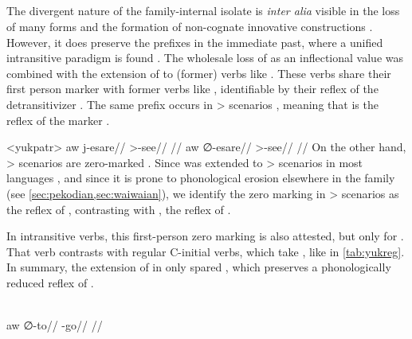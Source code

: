 \subsection{\yukpa {}}
\label{sec:yukpa}
The divergent nature of the family-internal isolate \yukpa is \textit{inter alia} visible in the loss of many \setone forms and the formation of non-cognate innovative constructions \parencite{meira2006syntactic}.
However, it does preserve the \setone prefixes in the immediate past, where a unified intransitive paradigm is found .
The wholesale loss of  as an inflectional value was combined with the extension of   to (former)  verbs like  .
%
%
%
These verbs share their first person marker  with former  verbs like  , identifiable by their reflex of the detransitivizer \detrz.
The same prefix occurs in > scenarios , meaning that  is the reflex of the \PC {} marker .

\pex<yukpatr>\yukpa \parencite[][139]{meira2006syntactic}
\begingl
\gla aw j-esare//
\glb {} >-see//
\glft {}//
\endgl
{}
\begingl
\gla aw {\normalfont ∅}-esare//
\glb {} >-see//
\glft {}//
\endgl
\xe
On the other hand, > scenarios are zero-marked .
Since \PC {}  was extended to > scenarios in most languages \parencite[81--82]{gildea1998}, and since it is prone to phonological erosion elsewhere in the family (see \cref{sec:pekodian,sec:waiwaian}), we identify the zero marking in > scenarios as the \yukpa reflex of , contrasting with , the reflex of .

In intransitive verbs, this first-person zero marking is also attested, but only for   .
That verb contrasts with regular C-initial verbs, which take , like  in \cref{tab:yukreg}.
In summary, the extension of  in \yukpa only spared  , which preserves a phonologically reduced reflex of .

\yukpa \parencite[][139]{meira2006syntactic}\\
\begingl
\gla aw {\normalfont ∅}-to//
\glb {} -go//
\glft {}//
\endgl
\xe